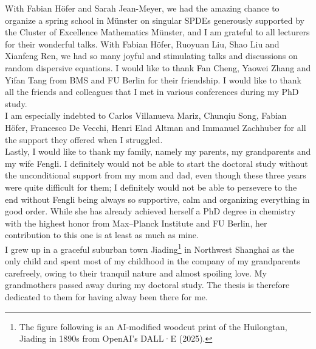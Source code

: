 \begin{acknowledgements}
With Fabian Höfer and Sarah Jean-Meyer, we had the amazing chance to organize a spring school in Münster on singular SPDEs generously supported by the Cluster of Excellence Mathematics Münster, and I am grateful to all lecturers for their wonderful talks. With Fabian Höfer, Ruoyuan Liu, Shao Liu and Xianfeng Ren, we had so many joyful and stimulating talks and discussions on random dispersive equations. I would like to thank Fan Cheng, Yaowei Zhang and Yifan Tang from BMS and FU Berlin for their friendship. I would like to thank all the friends and colleagues that I met in various conferences during my PhD study.\\ 

I am especially indebted to Carlos Villanueva Mariz, Chunqiu Song, Fabian Höfer, Francesco De Vecchi, Henri Elad Altman and Immanuel Zachhuber for all the support they offered when I struggled. \\

Lastly, I would like to thank my family, namely my parents, my grandparents and my wife Fengli. I definitely would not be able to start the doctoral study without the unconditional support from my mom and dad, even though these three years were quite difficult for them; I definitely would not be able to persevere to the end without Fengli being always so supportive, calm and organizing everything in good order. While she has already achieved herself a PhD degree in chemistry with the highest honor from Max–Planck Institute and FU Berlin, her contribution to this one is at least as much as mine. \\ 

I grew up in a graceful suburban town Jiading\footnote{The figure following is an AI-modified woodcut print of the Huilongtan, Jiading in 1890s from OpenAI’s DALL·E (2025).} in Northwest Shanghai as the only child and spent most of my childhood in the company of my grandparents carefreely, owing to their tranquil nature and almost spoiling love. My grandmothers passed away during my doctoral study. The thesis is therefore dedicated to them for having alway been there for me. 

\end{acknowledgements}

\makepicturepage